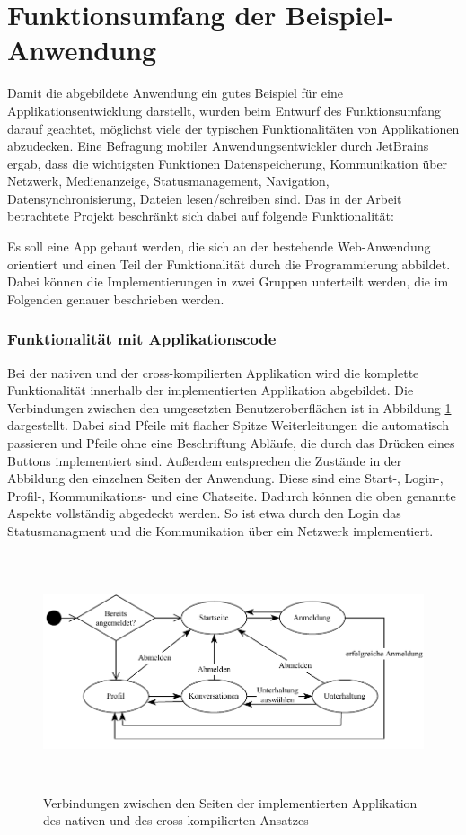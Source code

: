 \section{Funktionsumfang der Beispiel-Anwendung}
Damit die abgebildete Anwendung ein gutes Beispiel für eine Applikationsentwicklung darstellt, wurden beim Entwurf des Funktionsumfang darauf geachtet, möglichst viele der typischen Funktionalitäten von Applikationen abzudecken. Eine Befragung \cite{JetBrains_miscellaneous_2021} mobiler Anwendungsentwickler durch JetBrains ergab, dass die wichtigsten Funktionen Datenspeicherung, Kommunikation über Netzwerk, Medienanzeige, Statusmanagement, Navigation, Datensynchronisierung, Dateien lesen/schreiben sind.
Das in der Arbeit betrachtete Projekt beschränkt sich dabei auf folgende Funktionalität:

Es soll eine App gebaut werden, die sich an der bestehende Web-Anwendung orientiert und einen Teil der Funktionalität durch die Programmierung abbildet. Dabei können die Implementierungen in zwei Gruppen unterteilt werden, die im Folgenden genauer beschrieben werden.

\subsubsection{Funktionalität mit Applikationscode}
Bei der nativen und der cross-kompilierten Applikation wird die komplette Funktionalität innerhalb der implementierten Applikation abgebildet. Die Verbindungen zwischen den umgesetzten Benutzeroberflächen ist in Abbildung \ref{fig:pageflow} dargestellt. Dabei sind Pfeile mit flacher Spitze Weiterleitungen die automatisch passieren und Pfeile ohne eine Beschriftung Abläufe, die durch das Drücken eines Buttons implementiert sind. Außerdem entsprechen die Zustände in der Abbildung den einzelnen Seiten der Anwendung. Diese sind eine Start-, Login-, Profil-, Kommunikations- und eine Chatseite. Dadurch können die oben genannte Aspekte vollständig abgedeckt werden. So ist etwa durch den Login das Statusmanagment und die Kommunikation über ein Netzwerk implementiert. 

\begin{figure}[ht]
  \centering
  \includegraphics[height=7cm,keepaspectratio]{images/Pageflow_native_flutter.drawio.pdf} 
  \caption[Seitenablauf der implemierten nativen und cross-kompilierten Applikation]{Verbindungen zwischen den Seiten der implementierten Applikation des nativen und des cross-kompilierten Ansatzes}
  \label{fig:pageflow}
\end{figure}

